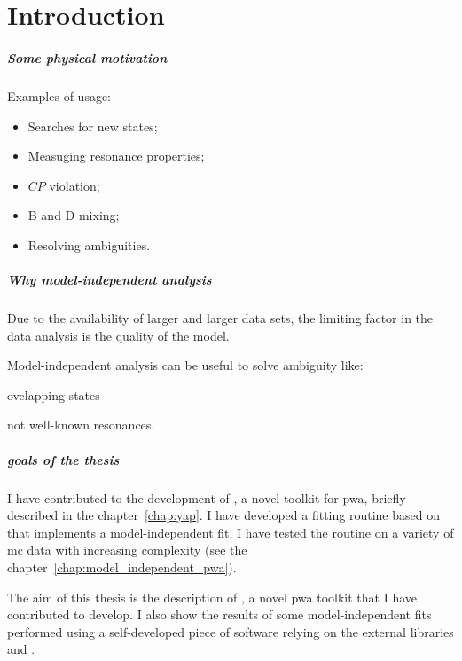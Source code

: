 \chapter{Introduction}


    \paragraph{Some physical motivation}
        Examples of usage:
        \begin{itemize}
            \item Searches for new states;
            \item Measuging resonance properties;
            \item $CP$ violation;
            \item B and D mixing;
            \item Resolving ambiguities.
        \end{itemize}

    \paragraph{Why model-independent analysis}

    Due to the availability of larger and larger data sets, the limiting factor in the data analysis is the quality of the model.


    Model-independent analysis can be useful to solve ambiguity like:

    ovelapping states

    not well-known resonances.

    \paragraph{goals of the thesis}

    I have contributed to the development of , a novel toolkit for \ac{pwa}, briefly described in the chapter~\ref{chap:yap}.
    I have developed a fitting routine based on  that implements a model-independent fit.
    I have tested the routine on a variety of \ac{mc} data with increasing complexity (see the chapter~\ref{chap:model_independent_pwa}).





    The aim of this thesis is the description of , a novel \ac{pwa} toolkit that I have contributed to develop.
    I also show the results of some model-independent fits performed using a self-developed piece of software relying on the external libraries  and .


